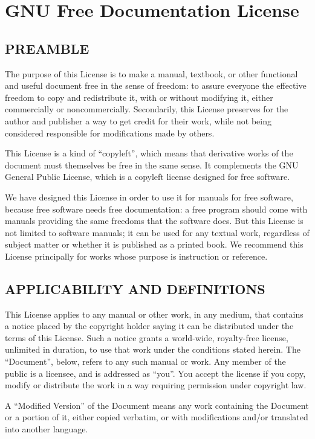 \chapter{GNU Free Documentation License}
\label{app:gnufreedocumentationlicense}
\section{PREAMBLE}
The purpose of this License is to make a manual, textbook,
or other functional and useful document free in the sense of
freedom: to assure everyone the effective freedom to copy
and redistribute it, with or without modifying it, either
commercially or noncommercially. Secondarily, this License
preserves for the author and publisher a way to get credit
for their work, while not being considered responsible for
modifications made by others.

This License is a kind of “copyleft”, which means that
derivative works of the document must themselves be free in
the same sense. It complements the GNU General Public License,
which is a copyleft license designed for free software.

We have designed this License in order to use it for
manuals for free software, because free software needs free
documentation: a free program should come with manuals
providing the same freedoms that the software does. But
this License is not limited to software manuals; it can be
used for any textual work, regardless of subject matter or
whether it is published as a printed book. We recommend this
License principally for works whose purpose is instruction
or reference.  

\section{APPLICABILITY AND DEFINITIONS}
This License applies to any manual or other work, in any
medium, that contains a notice placed by the copyright
holder saying it can be distributed under the terms of this
License. Such a notice grants a world-wide, royalty-free
license, unlimited in duration, to use that work under
the conditions stated herein. The “Document”, below,
refers to any such manual or work. Any member of the public
is a licensee, and is addressed as “you”. You accept the
license if you copy, modify or distribute the work in a way
requiring permission under copyright law.

A “Modified Version” of the Document means any work
containing the Document or a portion of it, either copied
verbatim, or with modifications and/or translated into
another language.


